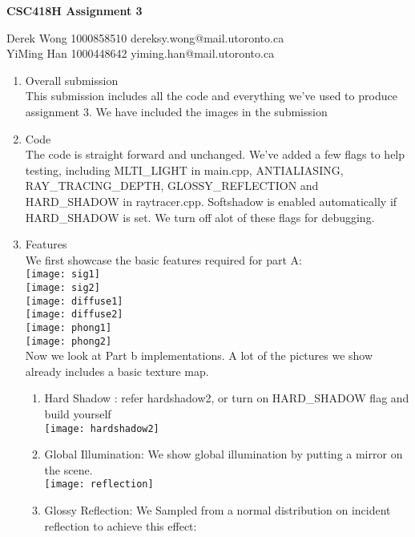 \documentclass[10pt]{article}
\begin{document}
	
	\begin{center}
		{\bf \Large \bf CSC418H Assignment 3}
	\end{center}
	
	\noindent
	Derek Wong   1000858510 dereksy.wong@mail.utoronto.ca 
	\\
	YiMing Han   1000448642 yiming.han@mail.utoronto.ca\\	
	
	\begin{enumerate}
		\item Overall submission \\
		This submission includes all the code and everything we've used to produce assignment 3. 
		We have included the images in the submission
		\item Code \\
		The code is straight forward and unchanged.  We've added a few flags to help testing, including MLTI\_LIGHT in main.cpp, ANTIALIASING, RAY\_TRACING\_DEPTH, GLOSSY\_REFLECTION and HARD\_SHADOW in raytracer.cpp.  Softshadow is enabled automatically if HARD\_SHADOW is set.  We turn off alot of these flags for debugging. 
		\item Features\\
		We first showcase the basic features required for part A:\\
		\texttt{[image: sig1]} \\
			\texttt{[image: sig2]} \\
			\texttt{[image: diffuse1]} \\
			\texttt{[image: diffuse2]} \\
				\texttt{[image: phong1]} \\
			\texttt{[image: phong2]} \\
			\clearpage
		Now we look at Part b implementations.  A lot of the pictures we show already includes a basic texture map.  
		\begin{enumerate}
			\item Hard Shadow : refer hardshadow2, or turn on HARD\_SHADOW flag and build yourself \\
				\texttt{[image: hardshadow2]} \\
			\item Global Illumination:   We show global illumination by putting a mirror on the scene. \\
			\texttt{[image: reflection]} \\
			\item  Glossy Reflection:  We Sampled from a normal distribution on incident reflection to achieve this effect:\\

\end{enumerate}
\end{enumerate}
\end{document}
